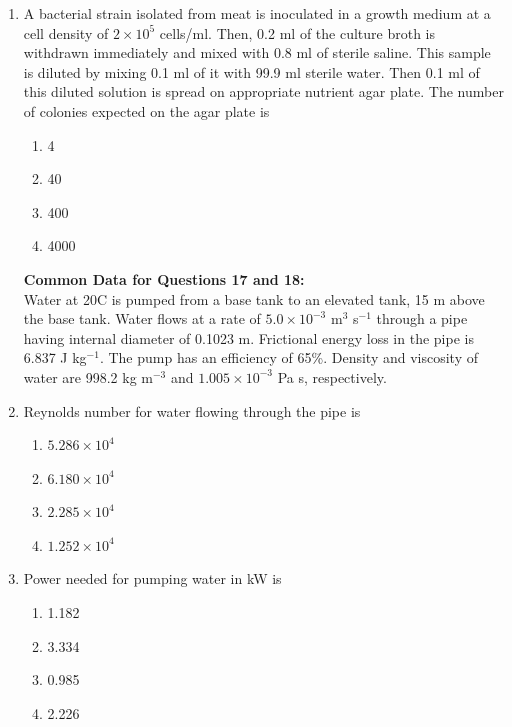 \documentclass[a4paper,10pt]{article}
\begin{document}
\begin{enumerate}
\item A bacterial strain isolated from meat is inoculated in a growth medium at a cell density of $2 \times 10^5$ cells/ml. Then, 0.2 ml of the culture broth is withdrawn immediately and mixed with 0.8 ml of sterile saline. This sample is diluted by mixing 0.1 ml of it with 99.9 ml sterile water. Then 0.1 ml of this diluted solution is spread on appropriate nutrient agar plate. The number of colonies expected on the agar plate is
\hfill{}

\begin{multicols}{4}
\begin{enumerate}
\item 4
\item 40
\item 400
\item 4000
\end{enumerate}
\end{multicols}

\textbf{Common Data for Questions 17 and 18:} \\
Water at 20\degree C is pumped from a base tank to an elevated tank, 15 m above the base tank. Water flows at a rate of $5.0 \times 10^{-3}$ m$^3$ s$^{-1}$ through a pipe having internal diameter of 0.1023 m. Frictional energy loss in the pipe is 6.837 J kg$^{-1}$. The pump has an efficiency of 65\%. Density and viscosity of water are 998.2 kg m$^{-3}$ and $1.005 \times 10^{-3}$ Pa s, respectively.

\item Reynolds number for water flowing through the pipe is
\hfill{}

\begin{multicols}{2}
\begin{enumerate}
\item $5.286 \times 10^4$
\item $6.180 \times 10^4$
\item $2.285 \times 10^4$
\item $1.252 \times 10^4$
\end{enumerate}
\end{multicols}

\item Power needed for pumping water in kW is
\hfill{}

\begin{multicols}{4}
\begin{enumerate}
\item 1.182
\item 3.334
\item 0.985
\item 2.226
\end{enumerate}
\end{multicols}


\end{enumerate}
\end{document}
